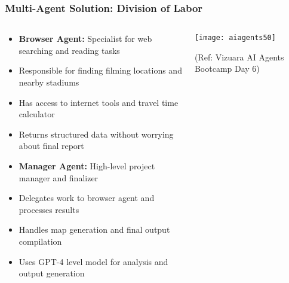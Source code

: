 \begin{frame}[fragile]\frametitle{Multi-Agent Solution: Division of Labor}
\begin{columns}
    \begin{column}[T]{0.6\linewidth}
      \begin{itemize}
		\item \textbf{Browser Agent:} Specialist for web searching and reading tasks
		\item Responsible for finding filming locations and nearby stadiums
		\item Has access to internet tools and travel time calculator
		\item Returns structured data without worrying about final report
		\item \textbf{Manager Agent:} High-level project manager and finalizer
		\item Delegates work to browser agent and processes results
		\item Handles map generation and final output compilation
		\item Uses GPT-4 level model for analysis and output generation
	  \end{itemize}
    \end{column}
    \begin{column}[T]{0.4\linewidth}
		\begin{center}
		\texttt{[image: aiagents50]}
		
		{\tiny (Ref: Vizuara AI Agents Bootcamp Day 6)}
		\end{center}	
    \end{column}
  \end{columns}
\end{frame}

